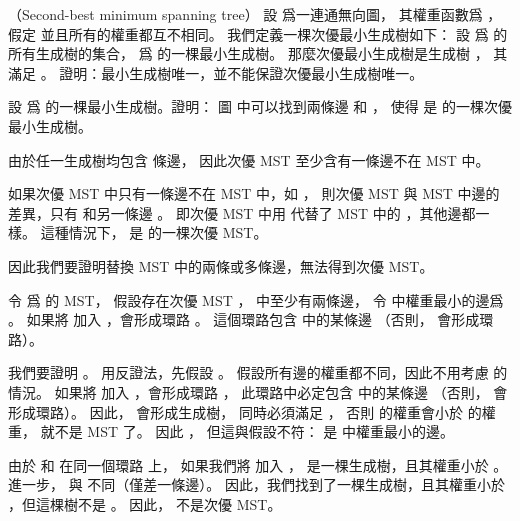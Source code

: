 \startsubject[
  title={Problems},
]

\startPROBLEM
（Second-best minimum spanning tree）
設  爲一連通無向圖，
其權重函數爲 ，
假定  並且所有的權重都互不相同。
我們定義一棵次優最小生成樹如下：
設 \m{\tau} 爲  的所有生成樹的集合，
  爲  的一棵最小生成樹。
那麼{\EMP 次優最小生成樹}是生成樹 ，
其滿足 。
\startigBase[a]\startitem
證明：最小生成樹唯一，並不能保證次優最小生成樹唯一。
\stopitem\stopigBase

\startANSWER
{}
\stopANSWER

\startigBase[continue]\startitem
設  爲  的一棵最小生成樹。證明：
圖  中可以找到兩條邊  和 ，
使得  是  的一棵次優最小生成樹。
\stopitem\stopigBase

\startANSWER
由於任一生成樹均包含  條邊，
因此次優 MST 至少含有一條邊不在 MST 中。

如果次優 MST 中只有一條邊不在 MST 中，如 ，
則次優 MST 與 MST 中邊的差異，只有  和另一條邊 。
即次優 MST 中用  代替了 MST 中的 ，其他邊都一樣。
這種情況下，  是  的一棵次優 MST。

因此我們要證明替換 MST 中的兩條或多條邊，無法得到次優 MST。

令  爲  的 MST，
假設存在次優 MST ，  中至少有兩條邊，
令  中權重最小的邊爲 。
如果將  加入 ，會形成環路 。
這個環路包含  中的某條邊  （否則，  會形成環路）。

我們要證明 。
用反證法，先假設 。
假設所有邊的權重都不同，因此不用考慮  的情況。
如果將  加入 ，會形成環路 ，
此環路中必定包含  中的某條邊  （否則，  會形成環路）。
因此，  會形成生成樹，
同時必須滿足 ，
否則  的權重會小於  的權重，  就不是 MST 了。
因此 ，
但這與假設不符：  是  中權重最小的邊。

由於  和  在同一個環路  上，
如果我們將  加入 ，
  是一棵生成樹，且其權重小於 。
進一步，  與  不同（僅差一條邊）。
因此，我們找到了一棵生成樹，且其權重小於 ，但這棵樹不是 。
因此，  不是次優 MST。
\stopANSWER

